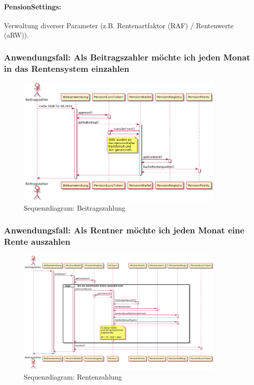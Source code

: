 \paragraph*{PensionSettings:} Verwaltung diverser Parameter (z.B. Rentenartfaktor (RAF) / Rentenwerte (aRW)).

\subsubsection{Anwendungsfall: Als Beitragszahler möchte ich jeden Monat in das Rentensystem einzahlen}

\begin{figure}[H]
    \centering
    \includegraphics[width=4.0in]{images/usecase-pay.png}
    \caption{Sequenzdiagram: Beitragszahlung}
    \label{fig:asure_architecture}
\end{figure}

\subsubsection{Anwendungsfall: Als Rentner möchte ich jeden Monat eine Rente auszahlen}

\begin{figure}[H]
    \centering
    \includegraphics[width=4.0in]{images/usecase-payout.png}
    \caption{Sequenzdiagram: Rentenzahlung}
    \label{fig:asure_architecture}
\end{figure}